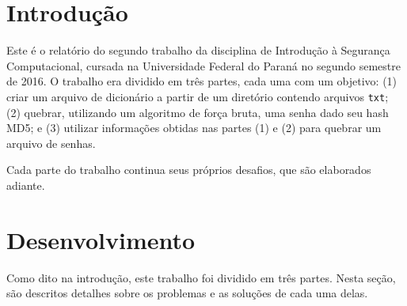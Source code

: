 \documentclass{sig-alternate-05-2015}
\begin{document}
%
\author{
%
%
\alignauthor
Renan Domingos Merlin Greca\\
			\\
\alignauthor
José Robyson Aggio Molinari\\
			\\
}
\date{5 September 2016}

\maketitle

\section{Introdução}
Este é o relatório do segundo trabalho da disciplina de Introdução à Segurança Computacional, cursada na Universidade Federal do Paraná no segundo semestre de 2016.
O trabalho era dividido em três partes, cada uma com um objetivo:
(1) criar um arquivo de dicionário a partir de um diretório contendo arquivos \texttt{txt};
(2) quebrar, utilizando um algoritmo de força bruta, uma senha dado seu hash MD5;
e (3) utilizar informações obtidas nas partes (1) e (2) para quebrar um arquivo de senhas.

Cada parte do trabalho continua seus próprios desafios, que são elaborados adiante.

\section{Desenvolvimento}
Como dito na introdução, este trabalho foi dividido em três partes.
Nesta seção, são descritos detalhes sobre os problemas e as soluções de cada uma delas.
\end{document}
